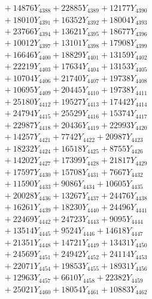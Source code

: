 \documentclass[a4paper,10pt]{article}
\begin{document}
{\begin{align}
&\;  + 14876 Y_{4388} + 22885 Y_{4389} + 12177 Y_{4390} \\[0.3ex]
&\;  + 18010 Y_{4391} + 16352 Y_{4392} + 18004 Y_{4393} \\[0.3ex]
&\;  + 23766 Y_{4394} + 13621 Y_{4395} + 18677 Y_{4396} \\[0.3ex]
&\;  + 10012 Y_{4397} + 13101 Y_{4398} + 17908 Y_{4399} \\[0.3ex]
&\;  + 16646 Y_{4400} + 18829 Y_{4401} + 13159 Y_{4402} \\[0.3ex]
&\;  + 22219 Y_{4403} + 17634 Y_{4404} + 13153 Y_{4405} \\[0.3ex]
&\;  + 10704 Y_{4406} + 21740 Y_{4407} + 19738 Y_{4408} \\[0.5ex]\allowbreak
&\;  + 10695 Y_{4409} + 20445 Y_{4410} + 19738 Y_{4411} \\[0.3ex]
&\;  + 25180 Y_{4412} + 19527 Y_{4413} + 17442 Y_{4414} \\[0.3ex]
&\;  + 24794 Y_{4415} + 25529 Y_{4416} + 15374 Y_{4417} \\[0.3ex]
&\;  + 22987 Y_{4418} + 20436 Y_{4419} + 22993 Y_{4420} \\[0.3ex]
&\;  + 14257 Y_{4421} + 7742 Y_{4422} + 20987 Y_{4423} \\[0.3ex]
&\;  + 18232 Y_{4424} + 16518 Y_{4425} + 8755 Y_{4426} \\[0.3ex]
&\;  + 14202 Y_{4427} + 17399 Y_{4428} + 21817 Y_{4429} \\[0.3ex]
&\;  + 17597 Y_{4430} + 15708 Y_{4431} + 7667 Y_{4432} \\[0.3ex]
&\;  + 11590 Y_{4433} + 9086 Y_{4434} + 10605 Y_{4435} \\[0.3ex]
&\;  + 20028 Y_{4436} + 13267 Y_{4437} + 24476 Y_{4438} \\[0.5ex]\allowbreak
&\;  + 16261 Y_{4439} + 18230 Y_{4440} + 24496 Y_{4441} \\[0.3ex]
&\;  + 22469 Y_{4442} + 24723 Y_{4443} + 9095 Y_{4444} \\[0.3ex]
&\;  + 13514 Y_{4445} + 9524 Y_{4446} + 14618 Y_{4447} \\[0.3ex]
&\;  + 21351 Y_{4448} + 14721 Y_{4449} + 13431 Y_{4450} \\[0.3ex]
&\;  + 24569 Y_{4451} + 24942 Y_{4452} + 24114 Y_{4453} \\[0.3ex]
&\;  + 22071 Y_{4454} + 19853 Y_{4455} + 18931 Y_{4456} \\[0.3ex]
&\;  + 12963 Y_{4457} + 6610 Y_{4458} + 22382 Y_{4459} \\[0.3ex]
&\;  + 25021 Y_{4460} + 18054 Y_{4461} + 10883 Y_{4462} \\[0.3ex]

\end{align}}
\end{document}
